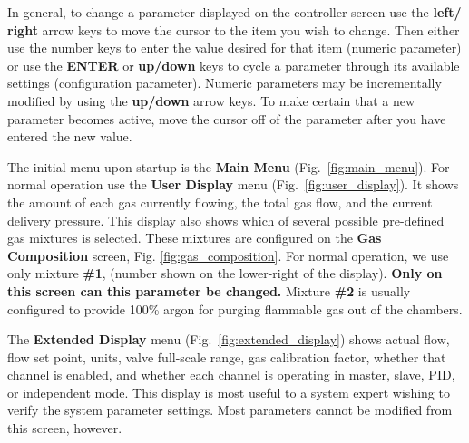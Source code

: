 In general, to change a parameter displayed on the controller screen
use the \textbf{left/ right} arrow keys to move the cursor to the item you
wish to change. Then either use the number keys to enter the value
desired for that item (numeric parameter) or use the {\bf ENTER} or
{\bf up/down} keys to cycle a parameter through its available settings
(configuration parameter). Numeric parameters may be incrementally
modified by using the {\bf up/down} arrow keys. To make certain that a
new parameter becomes active, move the cursor off of the parameter
after you have entered the new value.

The initial menu upon startup is the {\bf Main Menu}
(Fig.~\ref{fig:main_menu}).  For normal operation use the {\bf User
Display} menu (Fig.~\ref{fig:user_display}). It shows the amount of
each gas currently flowing, the total gas flow, and the current
delivery pressure. This display also shows which of several possible
pre-defined gas mixtures is selected. These mixtures are configured 
on the {\bf Gas Composition} screen, Fig. \ref{fig:gas_composition}.
For normal operation, we use
only mixture {\bf \#1}, (number shown on the lower-right of the
display). {\bf Only on this screen can this parameter be changed.}
Mixture {\bf \#2} is usually configured to provide 100\% argon for
purging flammable gas out of the chambers.

The {\bf Extended Display} menu (Fig.~\ref{fig:extended_display})
shows actual flow, flow set point, units, valve full-scale range, gas
calibration factor, whether that channel is enabled, and whether each
channel is operating in master, slave, PID, or independent mode. This
display is most useful to a system expert wishing to verify the system
parameter settings.  Most parameters cannot be modified from this
screen, however.

